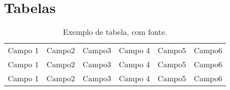 \clearpage
\section{Tabelas} 

\begin{table}[!ht]%
  \begin{center}	%
  \caption{Exemplo de tabela, com fonte.}
    \begin{tabular}{l|l|c|c|r|r}
			\hline %
				Campo 1 & Campo2 & Campo3 & Campo 4 & Campo5 & Campo6 \\
				Campo 1 & Campo2 & Campo3 & Campo 4 & Campo5 & Campo6 \\
				Campo 1 & Campo2 & Campo3 & Campo 4 & Campo5 & Campo6 \\				
			\hline %
    \end{tabular}
    \end{center}
\end{table}


